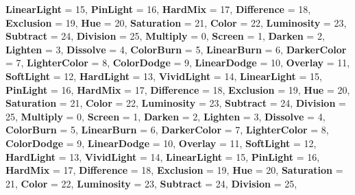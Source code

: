 \begin{DoxyCompactItemize}
{\bfseries Linear\+Light} = 15, 
\newline
{\bfseries Pin\+Light} = 16, 
{\bfseries Hard\+Mix} = 17, 
{\bfseries Difference} = 18, 
{\bfseries Exclusion} = 19, 
\newline
{\bfseries Hue} = 20, 
{\bfseries Saturation} = 21, 
{\bfseries Color} = 22, 
{\bfseries Luminosity} = 23, 
\newline
{\bfseries Subtract} = 24, 
{\bfseries Division} = 25, 
{\bfseries Multiply} = 0, 
{\bfseries Screen} = 1, 
\newline
{\bfseries Darken} = 2, 
{\bfseries Lighten} = 3, 
{\bfseries Dissolve} = 4, 
{\bfseries Color\+Burn} = 5, 
\newline
{\bfseries Linear\+Burn} = 6, 
{\bfseries Darker\+Color} = 7, 
{\bfseries Lighter\+Color} = 8, 
{\bfseries Color\+Dodge} = 9, 
\newline
{\bfseries Linear\+Dodge} = 10, 
{\bfseries Overlay} = 11, 
{\bfseries Soft\+Light} = 12, 
{\bfseries Hard\+Light} = 13, 
\newline
{\bfseries Vivid\+Light} = 14, 
{\bfseries Linear\+Light} = 15, 
{\bfseries Pin\+Light} = 16, 
{\bfseries Hard\+Mix} = 17, 
\newline
{\bfseries Difference} = 18, 
{\bfseries Exclusion} = 19, 
{\bfseries Hue} = 20, 
{\bfseries Saturation} = 21, 
\newline
{\bfseries Color} = 22, 
{\bfseries Luminosity} = 23, 
{\bfseries Subtract} = 24, 
{\bfseries Division} = 25, 
\newline
{\bfseries Multiply} = 0, 
{\bfseries Screen} = 1, 
{\bfseries Darken} = 2, 
{\bfseries Lighten} = 3, 
\newline
{\bfseries Dissolve} = 4, 
{\bfseries Color\+Burn} = 5, 
{\bfseries Linear\+Burn} = 6, 
{\bfseries Darker\+Color} = 7, 
\newline
{\bfseries Lighter\+Color} = 8, 
{\bfseries Color\+Dodge} = 9, 
{\bfseries Linear\+Dodge} = 10, 
{\bfseries Overlay} = 11, 
\newline
{\bfseries Soft\+Light} = 12, 
{\bfseries Hard\+Light} = 13, 
{\bfseries Vivid\+Light} = 14, 
{\bfseries Linear\+Light} = 15, 
\newline
{\bfseries Pin\+Light} = 16, 
{\bfseries Hard\+Mix} = 17, 
{\bfseries Difference} = 18, 
{\bfseries Exclusion} = 19, 
\newline
{\bfseries Hue} = 20, 
{\bfseries Saturation} = 21, 
{\bfseries Color} = 22, 
{\bfseries Luminosity} = 23, 
\newline
{\bfseries Subtract} = 24, 
{\bfseries Division} = 25, 

\end{DoxyCompactItemize}
